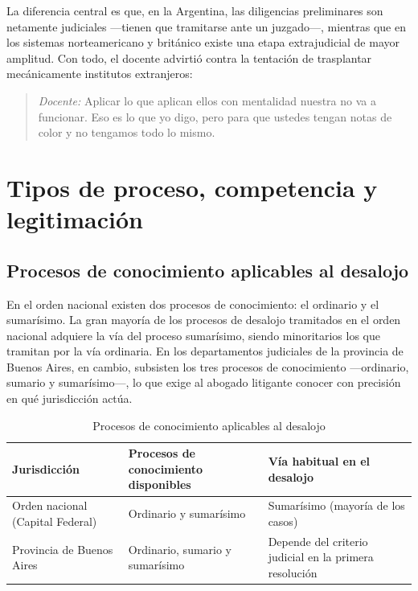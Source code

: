 \documentclass[12pt,oneside]{book}
\begin{document}
La diferencia central es que, en la Argentina, las diligencias preliminares son netamente judiciales —tienen que tramitarse ante un juzgado—, mientras que en los sistemas norteamericano y británico existe una etapa extrajudicial de mayor amplitud. Con todo, el docente advirtió contra la tentación de trasplantar mecánicamente institutos extranjeros:

\begin{quote}
\textit{Docente:} Aplicar lo que aplican ellos con mentalidad nuestra no va a funcionar. Eso es lo que yo digo, pero para que ustedes tengan notas de color y no tengamos todo lo mismo.
\end{quote}

\chapter{Tipos de proceso, competencia y legitimación}

\section{Procesos de conocimiento aplicables al desalojo}

En el orden nacional existen dos procesos de conocimiento: el ordinario y el sumarísimo. La gran mayoría de los procesos de desalojo tramitados en el orden nacional adquiere la vía del proceso sumarísimo, siendo minoritarios los que tramitan por la vía ordinaria. En los departamentos judiciales de la provincia de Buenos Aires, en cambio, subsisten los tres procesos de conocimiento —ordinario, sumario y sumarísimo—, lo que exige al abogado litigante conocer con precisión en qué jurisdicción actúa.

\begin{table}[H]
\centering
\caption{Procesos de conocimiento aplicables al desalojo}
\begin{tabularx}{\textwidth}{>{\raggedright\arraybackslash}X >{\raggedright\arraybackslash}X >{\raggedright\arraybackslash}X}
\toprule
\textbf{Jurisdicción} & \textbf{Procesos de conocimiento disponibles} & \textbf{Vía habitual en el desalojo} \\
\midrule
Orden nacional (Capital Federal) & Ordinario y sumarísimo & Sumarísimo (mayoría de los casos) \\
Provincia de Buenos Aires & Ordinario, sumario y sumarísimo & Depende del criterio judicial en la primera resolución \\
\bottomrule
\end{tabularx}
\end{table}
\end{document}
